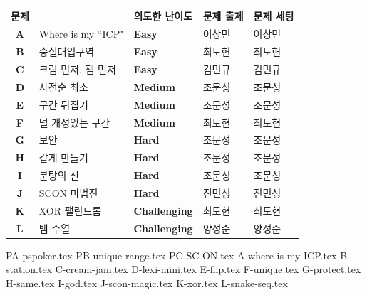     
    \begin{frame} %
        \begin{center}
            \begin{tabular}{cl|l|l|l}
                \hline
                문제 & & 의도한 난이도 & 문제 출제 & 문제 세팅 \\
                \hline
                \hline
                \textbf{A} & Where is my ``ICP" & \textbf{\color{acbronze} Easy} & 이창민 & 이창민 \\
                \textbf{B} & 숭실대입구역 & \textbf{\color{acbronze} Easy} & 최도현 & 최도현 \\
                \textbf{C} & 크림 먼저, 잼 먼저 & \textbf{\color{acbronze} Easy} & 김민규 & 김민규 \\
                \textbf{D} & 사전순 최소 & \textbf{\color{acsilver} Medium} & 조문성 & 조문성 \\
                \textbf{E} & 구간 뒤집기 & \textbf{\color{acsilver} Medium} & 조문성 & 조문성 \\
                \textbf{F} & 덜 개성있는 구간 & \textbf{\color{acsilver} Medium} & 최도현 & 최도현 \\
                \textbf{G} & 보안 & \textbf{\color{acgold} Hard} & 조문성 & 조문성 \\
                \textbf{H} & 같게 만들기 & \textbf{\color{acgold} Hard} & 조문성 & 조문성 \\
                \textbf{I} & 분탕의 신 & \textbf{\color{acgold} Hard} & 조문성 & 조문성 \\
                \textbf{J} & SCON 마법진 & \textbf{\color{acgold} Hard} & 진민성 & 진민성 \\
                \textbf{K} & XOR 팰린드롬 & \textbf{\color{acplatinum} Challenging} & 최도현 & 최도현 \\
                \textbf{L} & 뱀 수열 & \textbf{\color{acplatinum} Challenging} & 양성준 & 양성준 \\
                
                \hline
            \end{tabular}
        \end{center}
    \end{frame}

    {PA-pspoker.tex}
    {PB-unique-range.tex}
    {PC-SC-ON.tex}
    {A-where-is-my-ICP.tex}
    {B-station.tex}
    {C-cream-jam.tex}
    {D-lexi-mini.tex}
    {E-flip.tex}
    {F-unique.tex}
    {G-protect.tex}
    {H-same.tex}
    {I-god.tex}
    {J-scon-magic.tex}
    {K-xor.tex}
    {L-snake-seq.tex}
        

